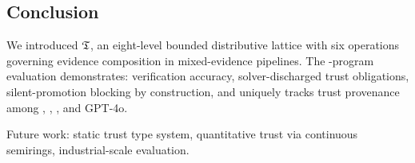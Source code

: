 \documentclass[11pt]{article}
\begin{document}
\subsection{Conclusion}

We introduced $\mathfrak{T}$, an eight-level bounded distributive lattice
with six operations governing evidence composition in mixed-evidence
pipelines.  The \compTotalPrograms{}-program evaluation demonstrates:
\compOverallAccuracy{} verification accuracy,
\compTrustSolverdischargedPct{} solver-discharged trust obligations,
silent-promotion blocking by construction,
and \JuGeo{} uniquely tracks trust provenance among
\LEAN{}, \Fstar{}, \Dafny{}, and GPT-4o.

Future work: static trust type system, quantitative trust
via continuous semirings, industrial-scale evaluation.


\end{document}
